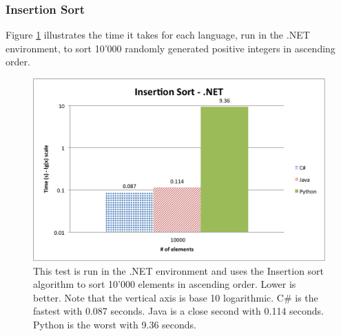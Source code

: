 \subsubsection{Insertion Sort}

Figure \ref{fig:net_insertion_sort} illustrates the time it takes for each language, run in the .NET environment, to sort 10'000 randomly generated positive integers in ascending order.

\begin{figure}[h]
	\centering
	\includegraphics[width=1.0\linewidth]{chapters/new_media/InsertionSortNet.png}
	\caption{This test is run in the .NET environment and uses the Insertion sort algorithm to sort 10'000 elements in ascending order. Lower is better. Note that the vertical axis is base 10 logarithmic. C\# is the fastest with 0.087 seconds. Java is a close second with 0.114 seconds. Python is the worst with 9.36 seconds.}
	\label{fig:net_insertion_sort}
\end{figure}
